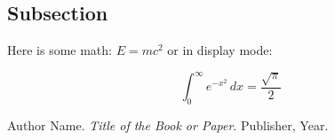 \documentclass[twocolumn]{article}
\begin{document}
\subsection{Subsection}
Here is some math: \( E = mc^2 \) or in display mode:

\[
\int_0^\infty e^{-x^2} \, dx = \frac{\sqrt{\pi}}{2}
\]


\begin{thebibliography}{9}
Author Name. \textit{Title of the Book or Paper}. Publisher, Year.
\end{thebibliography}
\end{document}
